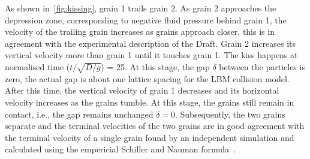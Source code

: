 As shown in~\cref{fig:kissing}, grain 1 trails grain 2. As grain 2 approaches 
the depression zone, corresponding to negative fluid pressure behind grain 1, 
the velocity of the trailing grain increases as grains approach closer, 
this is in agreement with the experimental description of the Draft. Grain 2 
increases its vertical velocity more than grain 1 until it touches grain 1. The 
kiss happens at normalised time ($t/\sqrt{D/g}$)  = 25. At this stage, the gap 
$\delta$ between the particles is zero, the actual gap is about one lattice 
spacing for the LBM collision model. After this time, the vertical velocity of 
grain 1 decreases and its horizontal velocity increases as the grains tumble. 
At this stage, the grains still remain in contact, i.e., the gap remains 
unchanged $\delta=0$. Subsequently, the two grains separate and the terminal 
velocities of the two grains are in good agreement with the terminal velocity 
of a single grain found by an independent simulation and calculated using the 
empericial Schiller and Nauman formula~\citep{Komiwes2005}.

